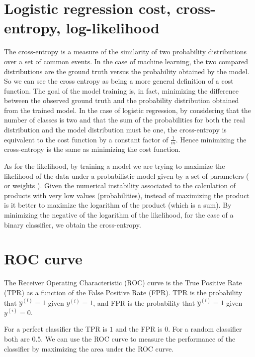 \documentclass[a4paper]{article}
\begin{document}

\section{Logistic regression cost, cross-entropy, log-likelihood}
The cross-entropy is a measure of the similarity of two probability distributions over a set of common events. In the case of machine learning, the two compared distributions are the ground truth versus the probability obtained by the model. So we can see the cross entropy as being a more general definition of a cost function. The goal of the model training is, in fact, minimizing the difference between the observed ground truth and the probability distribution obtained from the trained model. In the case of logistic regression, by considering that the number of classes is two and that the sum of the probabilities for both the real distribution and the model distribution must be one, the cross-entropy is equivalent to the cost function by a constant factor of $\frac{1}{m}$. Hence minimizing the cross-entropy is the same as minimizing the cost function.

As for the likelihood, by training a model we are trying to maximize the likelihood of the data under a probabilistic model given by a set of parameters ( or weights ). Given the numerical instability associated to the calculation of products with very low values (probabilities), instead of maximizing the product is it better to maximize the logarithm of the product (which is a sum). By minimizing the negative of the logarithm of the likelihood, for the case of a binary classifier, we obtain the cross-entropy.

\section{ROC curve}
The Receiver Operating Characteristic (ROC) curve is the True Positive Rate (TPR) as a function of the False Positive Rate (FPR). TPR is the probability that $\hat{y}^{(i)}=1$ given $y^{(i)}=1$, and FPR is the probability that $\hat{y}^{(i)}=1$ given $y^{(i)}=0$.

For a perfect classifier the TPR is $1$ and the FPR is $0$. For a random classifier both are $0.5$. We can use the ROC curve to measure the performance of the classifier by maximizing the area under the ROC curve.
\end{document}
